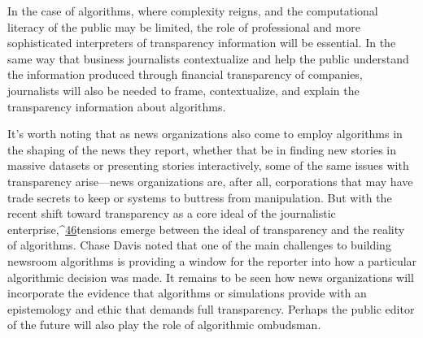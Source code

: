 In the case of algorithms, where complexity reigns, and the computational literacy of the public may be limited, the role of professional and more sophisticated interpreters of transparency information will be essential. In the same way that business journalists contextualize and help the public understand the information produced through financial transparency of companies, journalists will also be needed to frame, contextualize, and explain the transparency information about algorithms. 

It's worth noting that as news organizations also come to employ algorithms in the shaping of the news they report, whether that be in finding new stories in massive datasets or presenting stories interactively, some of the same issues with transparency arise—news organizations are, after all, corporations that may have trade secrets to keep or systems to buttress from manipulation. But with the recent shift toward transparency as a core ideal of the journalistic enterprise,^{\href{#endnotes}{46}}tensions emerge between the ideal of transparency and the reality of algorithms. Chase Davis noted that one of the main challenges to building newsroom algorithms is providing a window for the reporter into how a particular algorithmic decision was made. It remains to be seen how news organizations will incorporate the evidence that algorithms or simulations provide with an epistemology and ethic that demands full transparency. Perhaps the public editor of the future will also play the role of algorithmic ombudsman. 

